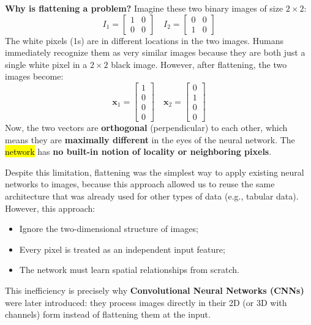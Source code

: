 \highspace
\textcolor{Red2}{ \textbf{Why is flattening a problem?}} Imagine these two binary images of size $2 \times 2$:
\begin{equation*}
    I_1 = \begin{bmatrix}
        1 & 0 \\
        0 & 0
    \end{bmatrix}
    \quad
    I_2 = \begin{bmatrix}
        0 & 0 \\
        1 & 0
    \end{bmatrix}
\end{equation*}
The white pixels (1s) are in different locations in the two images. Humans immediately recognize them as very similar images because they are both just a single white pixel in a $2 \times 2$ black image. However, after flattening, the two images become:
\begin{equation*}
    \mathbf{x}_1 = \begin{bmatrix}
        1 \\
        0 \\
        0 \\
        0
    \end{bmatrix}
    \quad
    \mathbf{x}_2 = \begin{bmatrix}
        0 \\
        1 \\
        0 \\
        0
    \end{bmatrix}
\end{equation*}
Now, the two vectors are \textbf{orthogonal} (perpendicular) to each other, which means they are \textbf{maximally different} in the eyes of the neural network. The \hl{network} has \textbf{no built-in notion of locality or neighboring pixels}.

\highspace
Despite this limitation, flattening was the simplest way to apply existing neural networks to images, because this approach allowed us to reuse the same architecture that was already used for other types of data (e.g., tabular data). However, this approach:
\begin{itemize}
    \item[\textcolor{Red2}{\faIcon{times}}] Ignore the two-dimensional structure of images;
    \item[\textcolor{Red2}{\faIcon{times}}] Every pixel is treated as an independent input feature;
    \item[\textcolor{Red2}{\faIcon{times}}] The network must learn spatial relationships from scratch.
\end{itemize}
This inefficiency is precisely why \textbf{Convolutional Neural Networks (CNNs)} were later introduced: they process images directly in their 2D (or 3D with channels) form instead of flattening them at the input.